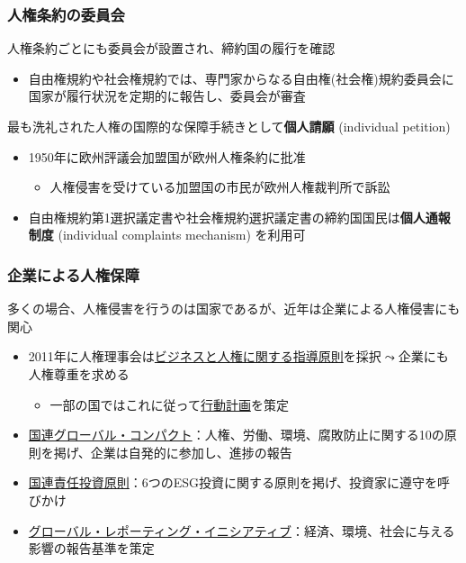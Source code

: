 \documentclass[
  xelatex,
  ja=standard]{bxjsarticle}
\providecommand{\tightlist}{%
  \setlength{\itemsep}{0pt}\setlength{\parskip}{0pt}}\usepackage{longtable,booktabs,array}
\begin{document}
\hypertarget{ux4ebaux6a29ux6761ux7d04ux306eux59d4ux54e1ux4f1a}{%
\subsubsection{人権条約の委員会}\label{ux4ebaux6a29ux6761ux7d04ux306eux59d4ux54e1ux4f1a}}

人権条約ごとにも委員会が設置され、締約国の履行を確認

\begin{itemize}
\tightlist
\item
  自由権規約や社会権規約では、専門家からなる自由権(社会権)規約委員会に国家が履行状況を定期的に報告し、委員会が審査
\end{itemize}

最も洗礼された人権の国際的な保障手続きとして\textbf{個人請願}
(individual petition)

\begin{itemize}
\tightlist
\item
  1950年に欧州評議会加盟国が欧州人権条約に批准

  \begin{itemize}
  \tightlist
  \item
    人権侵害を受けている加盟国の市民が欧州人権裁判所で訴訟
  \end{itemize}
\item
  自由権規約第1選択議定書や社会権規約選択議定書の締約国国民は\textbf{個人通報制度}
  (individual complaints mechanism) を利用可
\end{itemize}

\hypertarget{ux4f01ux696dux306bux3088ux308bux4ebaux6a29ux4fddux969c}{%
\subsubsection{企業による人権保障}\label{ux4f01ux696dux306bux3088ux308bux4ebaux6a29ux4fddux969c}}

多くの場合、人権侵害を行うのは国家であるが、近年は企業による人権侵害にも関心

\begin{itemize}
\tightlist
\item
  2011年に人権理事会は\href{https://www.mofa.go.jp/mofaj/gaiko/bhr/index.html}{ビジネスと人権に関する指導原則}を採択\(\leadsto\)企業にも人権尊重を求める

  \begin{itemize}
  \tightlist
  \item
    一部の国ではこれに従って\href{https://www.ohchr.org/en/special-procedures/wg-business/national-action-plans-business-and-human-rights}{行動計画}を策定
  \end{itemize}
\item
  \href{https://www.unglobalcompact.org/}{国連グローバル・コンパクト}：人権、労働、環境、腐敗防止に関する10の原則を掲げ、企業は自発的に参加し、進捗の報告
\item
  \href{https://www.unpri.org/}{国連責任投資原則}：6つのESG投資に関する原則を掲げ、投資家に遵守を呼びかけ
\item
  \href{https://www.globalreporting.org/}{グローバル・レポーティング・イニシアティブ}：経済、環境、社会に与える影響の報告基準を策定
\end{itemize}
\end{document}
